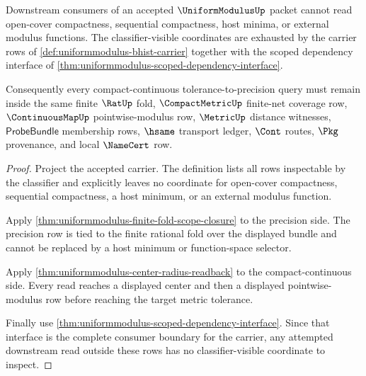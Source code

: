 \begin{theorem}
\label{thm:uniformmodulus-compact-continuous-nonescape}
Downstream consumers of an accepted $\UniformModulusUp$ packet cannot read open-cover compactness, sequential compactness, host minima, or external modulus functions. The classifier-visible coordinates are exhausted by the carrier rows of \autoref{def:uniformmodulus-bhist-carrier} together with the scoped dependency interface of \autoref{thm:uniformmodulus-scoped-dependency-interface}.

Consequently every compact-continuous tolerance-to-precision query must remain inside the same finite $\RatUp$ fold, $\CompactMetricUp$ finite-net coverage row, $\ContinuousMapUp$ pointwise-modulus row, $\MetricUp$ distance witnesses, $\mathsf{ProbeBundle}$ membership rows, $\hsame$ transport ledger, $\Cont$ routes, $\Pkg$ provenance, and local $\NameCert$ row.
\end{theorem}
\begin{proof}
Project the accepted carrier. The definition lists all rows inspectable by the classifier and explicitly leaves no coordinate for open-cover compactness, sequential compactness, a host minimum, or an external modulus function.

Apply \autoref{thm:uniformmodulus-finite-fold-scope-closure} to the precision side. The precision row is tied to the finite rational fold over the displayed bundle and cannot be replaced by a host minimum or function-space selector.

Apply \autoref{thm:uniformmodulus-center-radius-readback} to the compact-continuous side. Every read reaches a displayed center and then a displayed pointwise-modulus row before reaching the target metric tolerance.

Finally use \autoref{thm:uniformmodulus-scoped-dependency-interface}. Since that interface is the complete consumer boundary for the carrier, any attempted downstream read outside these rows has no classifier-visible coordinate to inspect.
\end{proof}

